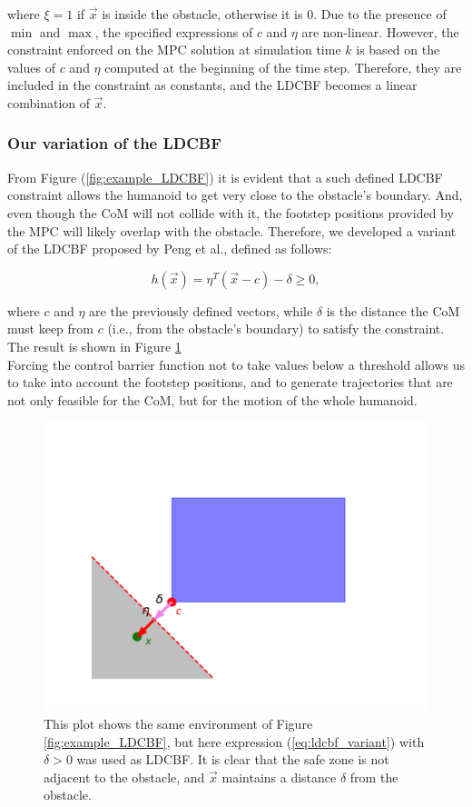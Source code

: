 where $\xi=1$ if $\vec{x}$ is inside the obstacle, otherwise it is $0$.
Due to the presence of $\min$ and $\max$, the specified expressions of $c$ and $\eta$ are non-linear. However, the constraint enforced on the MPC solution at simulation time $k$ is based on the values of $c$ and $\eta$ computed at the beginning of the time step. Therefore, they are included in the constraint as constants, and the LDCBF becomes a linear combination of $\vec{x}$.

\subsubsection{Our variation of the LDCBF}\label{subsec:ldcbf_variant}
From Figure (\ref{fig:example_LDCBF}) it is evident that a such defined LDCBF constraint allows the humanoid to get very close to the obstacle's boundary. And, even though the CoM will not collide with it, the footstep positions provided by the MPC will likely overlap with the obstacle. Therefore, we developed a variant of the LDCBF proposed by Peng et al., defined as follows:

\begin{equation} \label{eq:ldcbf_variant}
h\left(\vec{x}\right) = \eta^T \left(\vec{x} - c\right) - \delta \geq 0,
\end{equation}

where $c$ and $\eta$ are the previously defined vectors, while $\delta$ is the distance the CoM must keep from $c$ (i.e., from the obstacle's boundary) to satisfy the constraint. The result is shown in Figure \ref{fig:example_LDCBF_variant}\\
Forcing the control barrier function not to take values below a threshold allows us to take into account the footstep positions, and to generate trajectories that are not only feasible for the CoM, but for the motion of the whole humanoid.

\begin{figure}[h]
    \centering
    \includegraphics[width=0.75\linewidth]{figures//MPC/example_ldcbf_variant.pdf}
    \caption{This plot shows the same environment of Figure \ref{fig:example_LDCBF}, but here expression (\ref{eq:ldcbf_variant}) with $\delta > 0$ was used as LDCBF. It is clear that the safe zone is not adjacent to the obstacle, and $\vec{x}$ maintains a distance $\delta$ from the obstacle.}
    \label{fig:example_LDCBF_variant}
\end{figure}